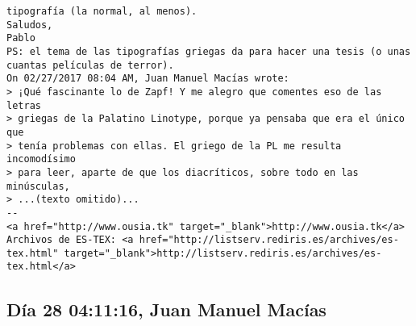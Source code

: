 \documentclass[a4paper,10pt]{article}
\begin{document}
\begin{lstlisting}
tipografía (la normal, al menos).
Saludos,
Pablo
PS: el tema de las tipografías griegas da para hacer una tesis (o unas
cuantas películas de terror).
On 02/27/2017 08:04 AM, Juan Manuel Macías wrote:
> ¡Qué fascinante lo de Zapf! Y me alegro que comentes eso de las letras
> griegas de la Palatino Linotype, porque ya pensaba que era el único que
> tenía problemas con ellas. El griego de la PL me resulta incomodísimo
> para leer, aparte de que los diacríticos, sobre todo en las minúsculas,
> ...(texto omitido)...
-- 
<a href="http://www.ousia.tk" target="_blank">http://www.ousia.tk</a>
Archivos de ES-TEX: <a href="http://listserv.rediris.es/archives/es-tex.html" target="_blank">http://listserv.rediris.es/archives/es-tex.html</a>

\end{lstlisting}

\subsection{Día 28 04:11:16, Juan Manuel Macías}
\end{document}
